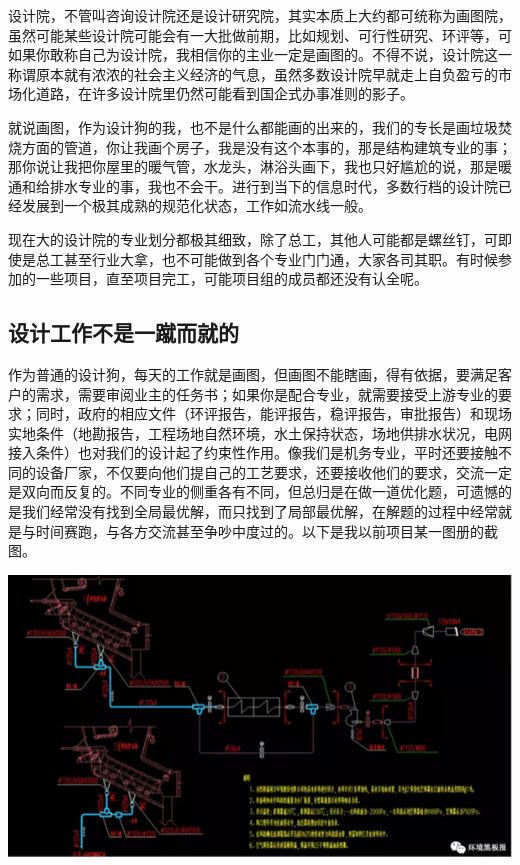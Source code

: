 \documentclass[
]{book}
\begin{document}
设计院，不管叫咨询设计院还是设计研究院，其实本质上大约都可统称为画图院，虽然可能某些设计院可能会有一大批做前期，比如规划、可行性研究、环评等，可如果你敢称自己为设计院，我相信你的主业一定是画图的。不得不说，设计院这一称谓原本就有浓浓的社会主义经济的气息，虽然多数设计院早就走上自负盈亏的市场化道路，在许多设计院里仍然可能看到国企式办事准则的影子。

就说画图，作为设计狗的我，也不是什么都能画的出来的，我们的专长是画垃圾焚烧方面的管道，你让我画个房子，我是没有这个本事的，那是结构建筑专业的事；那你说让我把你屋里的暖气管，水龙头，淋浴头画下，我也只好尴尬的说，那是暖通和给排水专业的事，我也不会干。进行到当下的信息时代，多数行档的设计院已经发展到一个极其成熟的规范化状态，工作如流水线一般。

现在大的设计院的专业划分都极其细致，除了总工，其他人可能都是螺丝钉，可即使是总工甚至行业大拿，也不可能做到各个专业门门通，大家各司其职。有时候参加的一些项目，直至项目完工，可能项目组的成员都还没有认全呢。

\hypertarget{ux8bbeux8ba1ux5de5ux4f5cux4e0dux662fux4e00ux8e74ux800cux5c31ux7684}{%
\subsection{设计工作不是一蹴而就的}\label{ux8bbeux8ba1ux5de5ux4f5cux4e0dux662fux4e00ux8e74ux800cux5c31ux7684}}

作为普通的设计狗，每天的工作就是画图，但画图不能瞎画，得有依据，要满足客户的需求，需要审阅业主的任务书；如果你是配合专业，就需要接受上游专业的要求；同时，政府的相应文件（环评报告，能评报告，稳评报告，审批报告）和现场实地条件（地勘报告，工程场地自然环境，水土保持状态，场地供排水状况，电网接入条件）也对我们的设计起了约束性作用。像我们是机务专业，平时还要接触不同的设备厂家，不仅要向他们提自己的工艺要求，还要接收他们的要求，交流一定是双向而反复的。不同专业的侧重各有不同，但总归是在做一道优化题，可遗憾的是我们经常没有找到全局最优解，而只找到了局部最优解，在解题的过程中经常就是与时间赛跑，与各方交流甚至争吵中度过的。以下是我以前项目某一图册的截图。

\includegraphics[width=8.33in]{images/sisi2}
\end{document}
